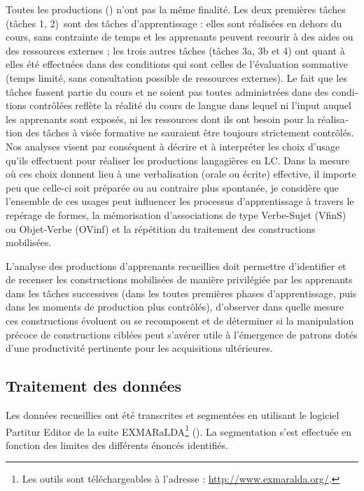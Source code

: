\documentclass[output=paper]{langscibook}
\begin{document}
\begin{otherlanguage}{french}
Toutes les productions () n’ont pas la même finalité. Les deux premières tâches (tâches 1, 2)~sont des tâches d’apprentissage : elles sont réalisées en dehors du cours, sans contrainte de temps et les apprenants peuvent recourir à des aides ou des ressources externes ; les trois autres tâches (tâches 3a, 3b et 4) ont quant à elles été effectuées dans des conditions qui sont celles de l’évaluation sommative (temps limité, sans consultation possible de ressources externes). Le fait que les tâches fassent partie du cours et ne soient pas toutes administrées dans des conditions contrôlées reflète la réalité du cours de langue dans lequel ni l’input auquel les apprenants sont exposés, ni les ressources dont ils ont besoin pour la réalisation des tâches à visée formative ne sauraient être toujours strictement contrôlés. Nos analyses visent par conséquent à décrire et à interpréter les choix d’usage qu’ils effectuent pour réaliser les productions langagières en LC. Dans la mesure où ces choix donnent lieu à une verbalisation (orale ou écrite) effective, il importe peu que celle-ci soit préparée ou au contraire plus spontanée, je considère que l’ensemble de ces usages peut influencer les processus d’apprentissage à travers le repérage de formes, la mémorisation d’associations de type Verbe-Sujet (VfinS) ou Objet-Verbe (OVinf) et la répétition du traitement des constructions mobilisées.

L’analyse des productions d’apprenants recueillies doit permettre d’identifier et de recenser les constructions mobilisées de manière privilégiée par les apprenants dans les tâches successives (dans les toutes premières phases d’apprentissage, puis dans les moments de production plus contrôlés), d’observer dans quelle mesure ces constructions évoluent ou se recomposent et de déterminer si la manipulation précoce de constructions ciblées peut s’avérer utile à l’émergence de patrons dotés d’une productivité pertinente pour les acquisitions ultérieures.

\subsection{Traitement des données}\label{sec:felce:5.2}

Les données recueillies ont été transcrites et segmentées en utilisant le logiciel Partitur Editor de la suite EXMARaLDA\footnote{Les outils sont téléchargeables à l’adresse : \url{http://www.exmaralda.org/}.} (\citealt{SchmidtWörner2014}). La segmentation s’est effectuée en fonction des limites des différents énoncés identifiés. 


\end{otherlanguage}
\end{document}
